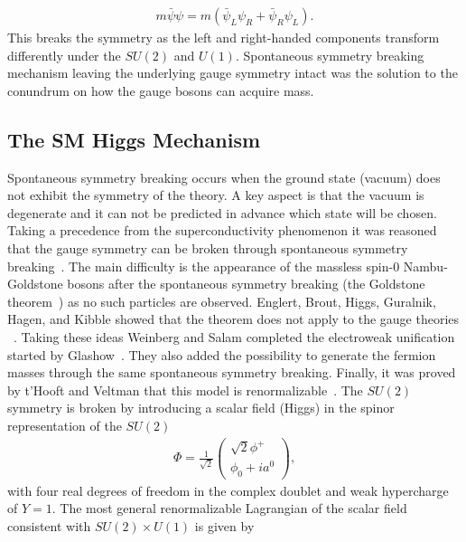 \begin{eqnarray} \label{eq:fermion}
m\bar{\psi}\psi = m(\bar{\psi}_L\psi_R+\bar{\psi}_R\psi_L).
\end{eqnarray}
This breaks the symmetry as the left and right-handed components transform differently under the $SU(2)$ and $U(1)$. Spontaneous symmetry breaking mechanism leaving the underlying gauge symmetry intact was the solution to the conundrum on how the gauge bosons can acquire mass. 

\subsection{The SM Higgs Mechanism}

Spontaneous symmetry breaking occurs when the ground state (vacuum) does not exhibit the symmetry of the theory. A key aspect is that the vacuum is degenerate and it can not be predicted in advance which state will be chosen. Taking a precedence from the superconductivity phenomenon it was reasoned that the gauge symmetry can be broken through spontaneous symmetry breaking~\cite{Nambu:1960tm,Anderson:1963pc}. The main difficulty is the appearance of the massless spin-$0$ Nambu-Goldstone bosons after the spontaneous symmetry breaking (the Goldstone theorem~\cite{Goldstone:1962es}) as no such particles are observed. Englert, Brout, Higgs, Guralnik, Hagen, and Kibble showed that the theorem does not apply to the gauge theories ~\cite{Englert:1964et,Higgs:1964ia,Higgs:1964pj,Guralnik:1964eu,Higgs:1966ev,Kibble:1967sv}.  Taking these ideas Weinberg and Salam completed the electroweak unification started by Glashow~\cite{Glashow:1961tr,Weinberg:1967tq,Salam:1968rm}. They also added the possibility to generate the fermion masses through the same spontaneous symmetry breaking. Finally, it was proved by t'Hooft and Veltman that this model is renormalizable~\cite{tHooft:1972fi}. The $SU(2)$ symmetry is broken by introducing a scalar field (Higgs) in the spinor representation of the $SU(2)$ 
\begin{eqnarray} \label{eq:lang_higgs}
\Phi  = \frac{1}{\sqrt{2}}\left(\begin{array}{c} \sqrt{2}\phi^{+}\\ \phi_{0}+ia^{0} \end{array} \right),
\end{eqnarray}   
with four real degrees of freedom in the complex doublet and weak hypercharge of $Y=1$. The most general renormalizable Lagrangian of the scalar field consistent with $SU(2) \times U(1)$ is given by
